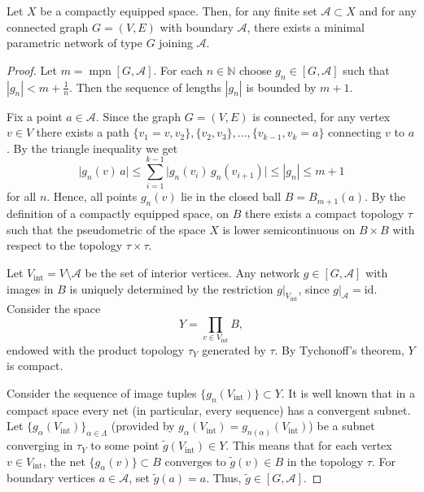 \documentclass{svproc}
\def\mpn{\operatorname{mpn}}
\begin{document}
\begin{theorem}\label{thm:Ambrosio}
Let $X$ be a compactly equipped space. Then, for any finite set $\mathcal{A}\subset X$ and for any connected graph $G = (V, E)$ with boundary $\mathcal{A}$, there exists a minimal parametric network of type $G$ joining $\mathcal{A}$.
\end{theorem}

\begin{proof}

Let $m = \mpn[G, \mathcal{A}]$. For each $n\in \mathbb{N}$ choose $g_n\in [G, \mathcal{A}]$ such that $|g_n| < m + \frac{1}{n}$. Then the sequence of lengths $|g_n|$ is bounded by $m+1$. 

Fix a point $a\in \mathcal{A}$. Since the graph $G = (V, E)$ is connected, for any vertex $v\in V$ there exists a path $\{v_1 = v, v_2\}, \{v_2, v_3\},\ldots , \{v_{k-1}, v_k = a\}$ connecting $v$ to $a$. By the triangle inequality we get
$$
\bigl|g_n(v)\, a\bigr| \le \sum_{i=1}^{k-1} \bigl|g_n(v_i)\, g_n(v_{i+1})\bigr| \le |g_n| \le m+1
$$
for all $n$. Hence, all points $g_n(v)$ lie in the closed ball $B = B_{m+1}(a)$. By the definition of a compactly equipped space, on $B$ there exists a compact topology $\tau$ such that the pseudometric of the space $X$ is lower semicontinuous on $B\times B$ with respect to the topology $\tau\times \tau$.

Let $V_{\text{int}} = V\setminus \mathcal{A}$ be the set of interior vertices. Any network $g\in [G, \mathcal{A}]$ with images in $B$ is uniquely determined by the restriction $g|_{V_{\text{int}}}$, since $g|_{\mathcal{A}} = \mathrm{id}$. Consider the space
$$
Y = \prod_{v\in V_{\text{int}}} B,
$$
endowed with the product topology $\tau_{Y}$ generated by $\tau$. By Tychonoff's theorem, $Y$ is compact.

Consider the sequence of image tuples $\bigl\{g_n(V_{\text{int}})\bigr\}\subset Y$. It is well known that in a compact space every net (in particular, every sequence) has a convergent subnet. Let $\bigl\{g_{\alpha}(V_{\text{int}})\bigr\}_{\alpha\in \Lambda}$ (provided by $g_{\alpha}(V_{\text{int}}) = g_{n(\alpha)}(V_{\text{int}})$) be a subnet converging in $\tau_Y$ to some point $\widetilde{g}(V_{\text{int}})\in Y$. This means that for each vertex $v\in V_{\text{int}}$, the net $\bigl\{g_{\alpha}(v)\bigr\}\subset B$ converges to $\widetilde{g}(v)\in B$ in the topology $\tau$. For boundary vertices $a\in \mathcal{A}$, set $\widetilde{g}(a) = a$. Thus, $\widetilde{g}\in [G, \mathcal{A}]$.


\end{proof}
\end{document}

